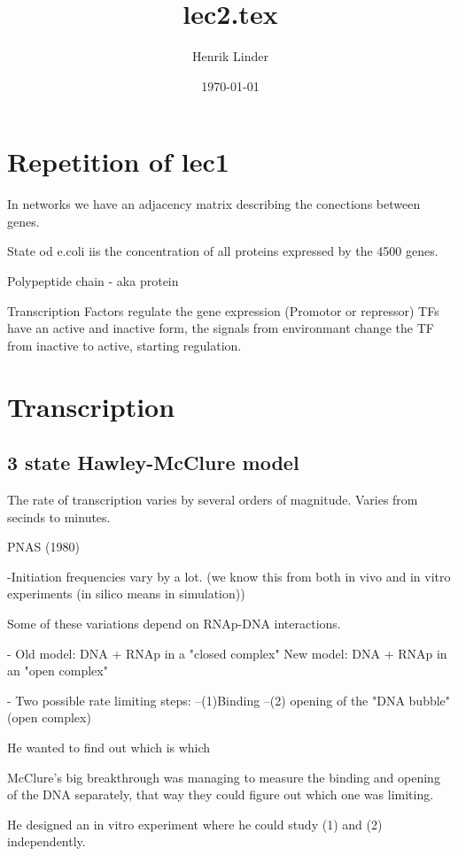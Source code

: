 \documentclass{article}
\title{lec2.tex }
\author{Henrik Linder}
\date{\today}
\begin{document}
\maketitle

\section{Repetition of lec1}
In networks we have an adjacency matrix describing the conections between genes. 

State od e.coli iis the concentration of all proteins expressed by the 4500 genes. 

Polypeptide chain  -  aka protein

Transcription Factors regulate the gene expression (Promotor or repressor)
TFs have an active and inactive form, the signals from environmant change the TF from inactive to active, starting regulation. 

\section{Transcription}

\subsection{
3 state Hawley-McClure model}

The rate of transcription varies by  several orders of magnitude. Varies from secinds to minutes. 


PNAS (1980)

-Initiation frequencies vary by a lot. 
(we know this from both in vivo and in vitro experiments (in silico means in simulation))

Some of these variations depend on RNAp-DNA interactions. 



- Old model: DNA + RNAp in a "closed complex"
 New model: DNA + RNAp in an "open complex"

 - Two possible rate limiting steps: 
	--(1)Binding 
	--(2) opening of the "DNA bubble" (open complex)
	
He wanted to find out which is which

McClure's big breakthrough was managing to measure the binding and opening of the DNA separately, that way they could figure out which one was limiting. 

He designed an in vitro experiment where he could study (1) and (2) independently. 
\end{document}
